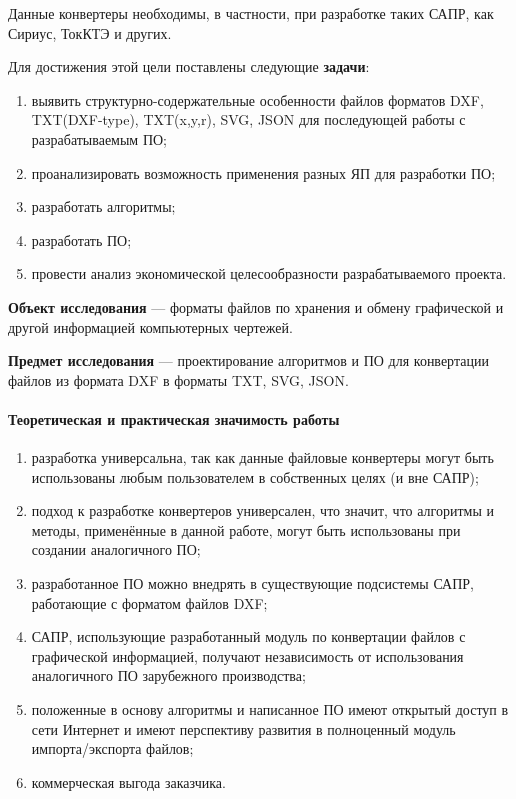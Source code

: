 Данные конвертеры необходимы, в частности, при разработке таких САПР, как Сириус, ТокКТЭ и других.

Для достижения этой цели поставлены следующие \textbf{задачи}:

\begin{enumerate}[1)]
	\item выявить структурно-содержательные особенности файлов форматов DXF, TXT(DXF-type), TXT(x,y,r), SVG, JSON для последующей работы с разрабатываемым ПО;
	\item проанализировать возможность применения разных ЯП для разработки ПО;
	\item разработать алгоритмы;
	\item разработать ПО;
	\item провести анализ экономической целесообразности разрабатываемого проекта.
\end{enumerate}

\textbf{Объект исследования} --- форматы файлов по хранения и обмену графической и другой информацией компьютерных чертежей.

\textbf{Предмет исследования} --- проектирование алгоритмов и ПО для конвертации файлов из формата DXF в форматы TXT, SVG, JSON.

\paragraph{Теоретическая и практическая значимость работы}

\begin{enumerate}
	\item разработка универсальна, так как данные файловые конвертеры могут быть использованы любым пользователем в собственных целях (и вне САПР);
	\item подход к разработке конвертеров универсален, что значит, что алгоритмы и методы, применённые в данной работе, могут быть использованы при создании аналогичного ПО;
	\item разработанное ПО можно внедрять в существующие подсистемы САПР, работающие с форматом файлов DXF;
	\item САПР, использующие разработанный модуль по конвертации файлов с графической информацией, получают независимость от использования аналогичного ПО зарубежного производства;
	\item положенные в основу алгоритмы и написанное ПО имеют открытый доступ в сети Интернет и имеют перспективу развития в полноценный модуль импорта/экспорта файлов;
	\item коммерческая выгода заказчика.
\end{enumerate}
